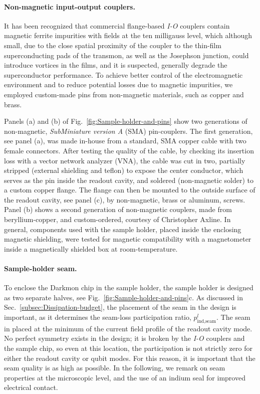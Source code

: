 \paragraph*{Non-magnetic input-output couplers.}

It has been recognized that commercial flange-based\emph{ I-O} couplers
contain magnetic ferrite impurities with fields at the ten milligauss
level, which although small, due to the close spatial proximity of
the coupler to the thin-film superconducting pads of the transmon,
as well as the Josephson junction, could introduce vortices in the
films, and it is suspected, generally degrade the superconductor performance.
To achieve better control of the electromagnetic environment and to
reduce potential losses due to magnetic impurities, we employed custom-made
pins from non-magnetic materials, such as copper and brass. 

Panels (a) and (b) of Fig.~\ref{fig:Sample-holder-and-pins} show
two generations of non-magnetic, \emph{SubMiniature version A} (SMA)
pin-couplers. The first generation, see panel (a), was made in-house
from a standard, SMA copper cable with two female connectors. After
testing the quality of the cable, by checking its insertion loss with
a vector network analyzer (VNA), the cable was cut in two, partially
stripped (external shielding and teflon) to expose the center conductor,
which serves as the pin inside the readout cavity, and soldered (non-magnetic
solder) to a custom copper flange. The flange can then be mounted
to the outside surface of the readout cavity, see panel (c), by non-magnetic,
brass or aluminum, screws. Panel (b) shows a second generation of
non-magnetic couplers, made from beryllium-copper, and custom-ordered,
courtesy of Christopher Axline. In general, components used with the
sample holder, placed inside the enclosing magnetic shielding, were
tested for magnetic compatibility with a magnetometer inside a magnetically
shielded box at room-temperature. 

\paragraph*{Sample-holder seam.}

To enclose the Darkmon chip in the sample holder, the sample holder
is designed as two separate halves, see Fig.~\ref{fig:Sample-holder-and-pins}c.
As discussed in Sec.~\ref{subsec:Dissipation-budget}, the placement
of the seam in the design is important, as it determines the seam-loss
participation ratio, $p_{\text{ind,seam}}^{l}$. The seam in placed
at the minimum of the current field profile of the readout cavity
mode. No perfect symmetry exists in the design; it is broken by the\emph{
I-O} couplers and the sample chip, so even at this location, the participation
is not strictly zero for either the readout cavity or qubit modes.
For this reason, it is important that the seam quality is as high
as possible. In the following, we remark on seam properties at the
microscopic level, and the use of an indium seal for improved electrical
contact.

